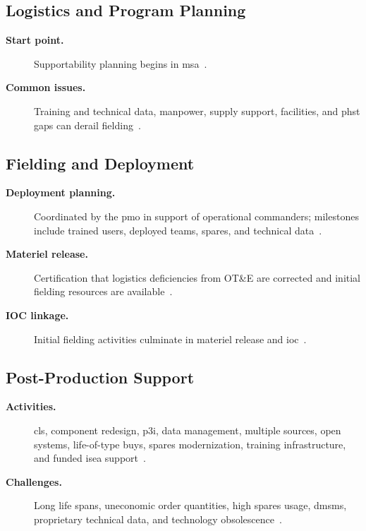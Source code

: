 \documentclass[../main.tex]{subfiles}
\begin{document}
\subsection{Logistics and Program Planning}
\begin{description}
  \item[\textbf{Start point.}] Supportability planning begins in \ac{msa}~\autocite{edo-3-5-4-acquisition-logistics-2025}.
  \item[\textbf{Common issues.}] Training and technical data, manpower, supply support, facilities, and \ac{phst} gaps can derail fielding~\autocite{edo-3-5-4-acquisition-logistics-2025}.
\end{description}

\subsection{Fielding and Deployment}
\begin{description}
  \item[\textbf{Deployment planning.}] Coordinated by the \ac{pmo} in support of operational commanders; milestones include trained users, deployed teams, spares, and technical data~\autocite{edo-3-5-4-acquisition-logistics-2025}.
  \item[\textbf{Materiel release.}] Certification that logistics deficiencies from OT\&E are corrected and initial fielding resources are available~\autocite{edo-3-5-4-acquisition-logistics-2025}.
  \item[\textbf{IOC linkage.}] Initial fielding activities culminate in materiel release and \ac{ioc}~\autocite{edo-3-5-4-acquisition-logistics-2025}.
\end{description}

\subsection{Post-Production Support}
\begin{description}
  \item[\textbf{Activities.}] \ac{cls}, component redesign, \ac{p3i}, data management, multiple sources, open systems, life-of-type buys, spares modernization, training infrastructure, and funded \ac{isea} support~\autocite{edo-3-5-4-acquisition-logistics-2025}.
  \item[\textbf{Challenges.}] Long life spans, uneconomic order quantities, high spares usage, \ac{dmsms}, proprietary technical data, and technology obsolescence~\autocite{edo-3-5-4-acquisition-logistics-2025}.
\end{description}
\end{document}
